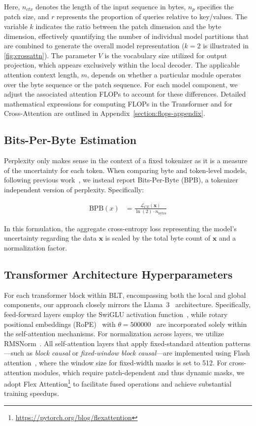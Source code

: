 Here, $n_{ctx}$ denotes the length of the input sequence in bytes, $n_p$ specifies the patch size, and $r$ represents the proportion of queries relative to key/values. The variable $k$ indicates the ratio between the patch dimension and the byte dimension, effectively quantifying the number of individual model partitions that are combined to generate the overall model representation ($k=2$ is illustrated in \autoref{fig:crossattn}). The parameter $V$ is the vocabulary size utilized for output projection, which appears exclusively within the local decoder. The applicable attention context length, $m$, depends on whether a particular module operates over the byte sequence or the patch sequence. For each model component, we adjust the associated attention FLOPs to account for these differences. Detailed mathematical expressions for computing FLOPs in the Transformer and for Cross-Attention are outlined in Appendix~\ref{section:flops-appendix}.

\subsection{Bits-Per-Byte Estimation} Perplexity only makes sense in the context of a fixed tokenizer as it is a measure of the uncertainty for each token. When comparing byte and token-level models, following previous work~\citep{xue2022byt5, yu2023megabyte, wang2024mambabyte}, we instead report Bits-Per-Byte (BPB), a tokenizer independent version of perplexity. Specifically:

\begin{align}
    \text{BPB}(x)&= \frac{\mathcal{L}_{CE}(\pmb{x})}{\ln(2)\cdot n_{\text{bytes}}}
\end{align}

In this formulation, the aggregate cross-entropy loss representing the model’s uncertainty regarding the data $\pmb{x}$ is scaled by the total byte count of $\pmb{x}$ and a normalization factor.

\subsection{Transformer Architecture Hyperparameters} For each transformer block within {\textsc BLT}, encompassing both the local and global components, our approach closely mirrors the Llama~3~\citep{dubey2024llama} architecture. Specifically, feed-forward layers employ the SwiGLU activation function~\citep{swiglu}, while rotary positional embeddings (RoPE)~\citep{RoPe} with $\theta=500000$~\citep{xiong2024effective} are incorporated solely within the self-attention mechanisms. For normalization across layers, we utilize RMSNorm~\citep{RMSNorm}. All self-attention layers that apply fixed-standard attention patterns—such as \textit{block causal} or \textit{fixed-window block causal}—are implemented using Flash attention~\citep{dao2022flashattention}, where the window size for fixed-width masks is set to 512. For cross-attention modules, which require patch-dependent and thus dynamic masks, we adopt Flex Attention\footnote{\url{https://pytorch.org/blog/flexattention}} to facilitate fused operations and achieve substantial training speedups.

